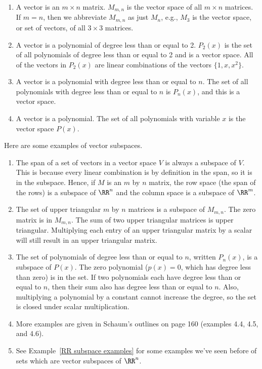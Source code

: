 \begin{example}
\begin{enumerate}
  \item A vector is an $m\times n$ matrix.  $M_{m,n}$ is the vector space of all $m\times n$ matrices.  If $m=n$, then we abbreviate $M_{m,n}$ as just $M_n$, e.g., $M_3$ is the vector space, or set of vectors, of all $3\times 3$ matrices.
  \item A vector is a polynomial of degree less than or equal to 2.  $P_2(x)$ is the set of all polynomials of degree less than or equal to 2 and is a vector space.  All of the vectors in $P_2(x)$ are linear combinations of the vectors $\{1,x,x^2\}$.
 \item A vector is a polynomial with degree less than or equal to $n$.  The set of all polynomials with degree less than or equal to $n$ is $P_n(x)$, and this is a vector space.
 \item A vector is a polynomial.  The set of all polynomials with variable $x$ is the vector space $P(x)$.
\end{enumerate}
\end{example}

\begin{example} Here are some examples of vector subspaces.
\begin{enumerate}
	\item  The span of a set of vectors in a vector space $V$ is always a subspace of $V$. This is because every linear combination is by definition in the span, so it is in the subspace.  Hence, if $M$ is an $m$ by $n$ matrix, the row space (the span of the rows) is a subspace of $\RR^n$ and the column space is a subspace of $\RR^m$.
	\item  The set of upper triangular $m$ by $n$ matrices is a subspace of $M_{m,n}$. The zero matrix is in $M_{m,n}$. The sum of two upper triangular matrices is upper triangular.  Multiplying each entry of an upper triangular matrix by a scalar will still result in an upper triangular matrix.
	\item  The set of polynomials of degree less than or equal to $n$, written $P_n(x)$, is a subspace of $P(x)$. The zero polynomial ($p(x)=0$, which has degree less than zero) is in the set.  If two polynomials each have degree less than or equal to $n$, then their sum also has degree less than or equal to $n$.  Also, multiplying a polynomial by a constant cannot increase the degree, so the set is closed under scalar multiplication.
	\item  More examples are given in Schaum's outlines on page 160 (examples 4.4, 4.5, and 4.6).
        \item See Example~\ref{RR subspace examples} for some examples we've seen before of sets which are vector subspaces of $\RR^n$.
\end{enumerate}
\end{example}

